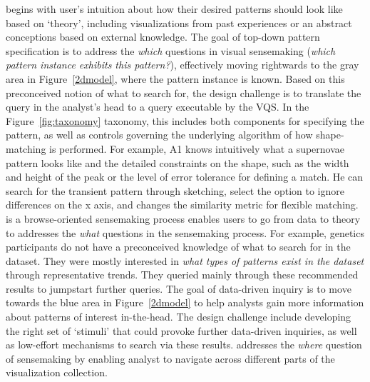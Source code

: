  begins with user's intuition about how their desired patterns should look like based on `theory', including visualizations from past experiences or an abstract conceptions based on external knowledge. The goal of top-down pattern specification is to address the \textit{which} questions in visual sensemaking (\textit{which pattern instance exhibits this pattern?}), effectively moving rightwards to the gray area in Figure~\ref{2dmodel}, where the pattern instance is known. Based on this preconceived notion of what to search for, the design challenge is to translate the query in the analyst's head to a query executable by the VQS. In the Figure~\ref{fig:taxonomy} taxonomy, this includes both components for specifying the pattern, as well as controls governing the underlying algorithm of how shape-matching is performed. For example, A1 knows intuitively what a supernovae pattern looks like and the detailed constraints on the shape, such as the width and height of the peak or the level of error tolerance for defining a match. He can search for the transient pattern through sketching, select the option to ignore differences on the x axis, and changes the similarity metric for flexible matching.  %
 is a browse-oriented sensemaking process enables users to go from data to theory to addresses the \textit{what} questions in the sensemaking process.
 For example, genetics participants do not have a preconceived knowledge of what to search for in the dataset. They were mostly interested in \textit{what types of patterns exist in the dataset} through representative trends. They queried mainly through these recommended results to jumpstart further queries. The goal of data-driven inquiry is to move towards the blue area in Figure~\ref{2dmodel} to help analysts gain more information about patterns of interest in-the-head.
The design challenge include developing the right set of `stimuli' that could provoke further data-driven inquiries, as well as low-effort mechanisms to search via these results.
 addresses the \textit{where} question of sensemaking by enabling analyst to navigate across different parts of the visualization collection. %
